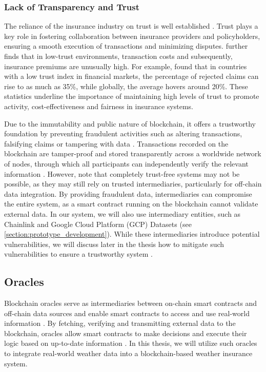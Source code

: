 \subsubsection{Lack of Transparency and Trust}
The reliance of the insurance industry on trust is well established \autocite{courbage2021trust}. Trust plays a key role in fostering collaboration between insurance providers and policyholders, ensuring a smooth execution of transactions and minimizing disputes. \textcite{guiso2012trust} further finds that in low-trust environments, transaction costs and subsequently, insurance premiums are unusually high. For example, \textcite{gennaioli2022trust} found that in countries with a low trust index in financial markets, the percentage of rejected claims can rise to as much as 35\%, while globally, the average hovers around 20\%. These statistics underline the importance of maintaining high levels of trust to promote activity, cost-effectiveness and fairness in insurance systems.

Due to the immutability and public nature of blockchain, it offers a trustworthy foundation by preventing fraudulent activities such as altering transactions, falsifying claims or tampering with data \autocite{Ahmad2024Fraud}. Transactions recorded on the blockchain are tamper-proof and stored transparently across a worldwide network of nodes, through which all participants can independently verify the relevant information \autocite{eigelshoven2021cryptocurrency}. However, \textcite{hawlitschek2018limits} note that completely trust-free systems may not be possible, as they may still rely on trusted intermediaries, particularly for off-chain data integration. By providing fraudulent data, intermediaries can compromise the entire system, as a smart contract running on the blockchain cannot validate external data. In our system, we will also use intermediary entities, such as Chainlink and Google Cloud Platform (GCP) Datasets (see \cref{section:prototype_development}). While these intermediaries introduce potential vulnerabilities, we will discuss later in the thesis how to mitigate such vulnerabilities to ensure a trustworthy system \autocite{Khan2022Investigation}.

\subsection{Oracles}
Blockchain oracles serve as intermediaries between on-chain smart contracts and off-chain data sources and enable smart contracts to access and use real-world information \autocite{caldarelli2022overview}. By fetching, verifying and transmitting external data to the blockchain, oracles allow smart contracts to make decisions and execute their logic based on up-to-date information \autocite{pasdar2023connect}. In this thesis, we will utilize such oracles to integrate real-world weather data into a blockchain-based weather insurance system.

